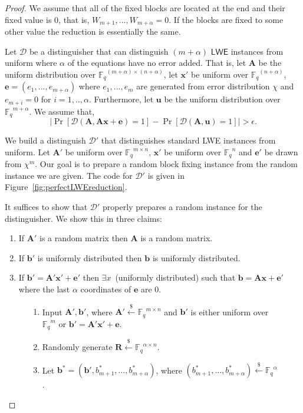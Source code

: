 \documentclass[11pt]{article}
\newcommand{\figref}[1]{\mbox{Figure~\ref{#1}}}
\newcommand{\class}[1]{{\ensuremath{\mathsf{#1}}}}
\newcommand{\vect}[1]{\ensuremath{\textbf{#1}}}
\newcommand{\Fq}{\ensuremath{\mathbb{F}_q}}
\newcommand{\D}{\mathcal{D}}
\newcommand{\LWE}{\class{LWE}}
\newcommand{\authnote}[2]{{\textcolor{red}{\textsf{#1 notes: }\textcolor{blue}{ #2}}\marginpar{\textcolor{red}{\textbf{!!!!!}}}}}
\newcommand{\authnote}[2]{}
\newcommand{\lnote}[1]{{\authnote{Leo}{#1}}}
\newcommand{\ve}{\vect{e}}
\newcommand{\vA}{\vect{A}}
\newcommand{\vx}{\vect{x}}
\newcommand{\vb}{\vect{b}}
\newcommand{\vu}{\vect{u}}
\begin{document}
\begin{proof}
We assume that all of the fixed blocks are located at the end and their fixed value is $0$, that is, $W_{m+1}, ..., W_{m+\alpha} =0$.  If the blocks are fixed to some other value the reduction is essentially the same.


Let $\D$ be a distinguisher that can distinguish $(m+\alpha)$ $\LWE$ instances from uniform where $\alpha$ of the equations have no error added.  That is, let $\vA$ be the uniform distribution over $\Fq^{(m+\alpha)\times(n+\alpha)}$, let $\vx'$ be uniform over $\Fq^{(n+\alpha)}$, $\ve= (e_1,..., e_{m+\alpha})$ where $e_1,..., e_m$ are generated from error distribution $\chi$ and $e_{m+i} =0$ for $i=1,..,\alpha$. Furthermore, let $\vu$ be the uniform distribution over $\Fq^{m+\alpha}$.  We assume that, 
\[
|\Pr[\D(\vA, \vA\vx+\ve) = 1] - \Pr[\D(\vA, \vu) =1]|> \epsilon.
\]

We build a distinguish $\D'$ that distinguishes standard LWE instances from uniform.  Let $\vA'$ be uniform over $\Fq^{m\times n}$, $\vx'$ be uniform over $\Fq^n$ and $\ve'$ be drawn from $\chi^m$.  Our goal is to prepare a random block fixing instance from the random instance we are given.  The code for $\D'$ is given in \figref{fig:perfectLWEreduction}.

It suffices to show that $\D'$ properly prepares a random instance for the distinguisher.  We show this in three claims: 
\begin{enumerate}
\item If $\vA'$ is a random matrix then $\vA$ is a random matrix.
\item If $\vb'$ is uniformly distributed then $\vb$ is uniformly distributed.
\item If $\vb' = \vA'\vx'+\ve'$ then $\exists x$~(uniformly distributed) such that $\vb = \vA \vx + \ve'$ where the last $\alpha$ coordinates of $\ve$ are $0$.
\end{enumerate}
\begin{figure}
\begin{enumerate}
\item Input $\vA', \vb'$, where $\vA' \overset{\$} \leftarrow \Fq^{m\times n}$ and $\vb'$ is either uniform over $\Fq^m$ or $\vb' = \vA'\vx' +\ve$.
\item Randomly generate $\vect{R} \overset{\$}\leftarrow \Fq^{\alpha \times n}$.
\item Let $\vb^* = (\vb', b^*_{m+1}, \ldots,b^*_{m+\alpha})$, where $(b^*_{m+1}, \ldots, b^*_{m+\alpha} )\overset{\$} \leftarrow \Fq^\alpha$.


\end{enumerate}
\end{figure}
\end{proof}
\end{document}
